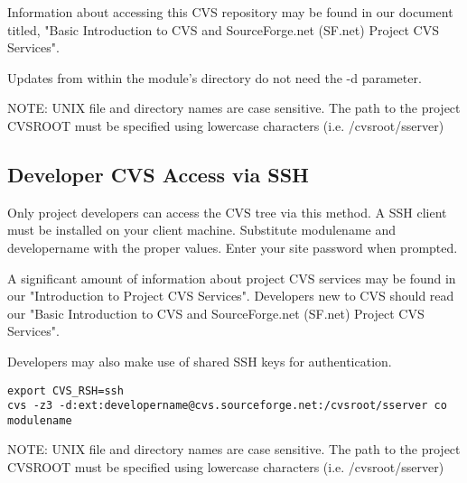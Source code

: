 Information about accessing this CVS repository may be found in our document titled, 
"Basic Introduction to CVS and SourceForge.net (SF.net) Project CVS Services".

Updates from within the module's directory do not need the -d parameter.

NOTE: UNIX file and directory names are case sensitive. 
The path to the project CVSROOT must be specified using lowercase characters (i.e. /cvsroot/sserver)


\subsection{Developer CVS Access via SSH}

Only project developers can access the CVS tree via this method. 
A SSH client must be installed on your client machine. Substitute modulename 
and developername with the proper values. Enter your site password when prompted.

A significant amount of information about project CVS services may be found in our 
"Introduction to Project CVS Services". Developers new to CVS should read our 
"Basic Introduction to CVS and SourceForge.net (SF.net) Project CVS Services".

Developers may also make use of shared SSH keys for authentication.

\begin{verbatim}
export CVS_RSH=ssh
cvs -z3 -d:ext:developername@cvs.sourceforge.net:/cvsroot/sserver co modulename
\end{verbatim}

NOTE: UNIX file and directory names are case sensitive. 
The path to the project CVSROOT must be specified using lowercase characters (i.e. /cvsroot/sserver)

